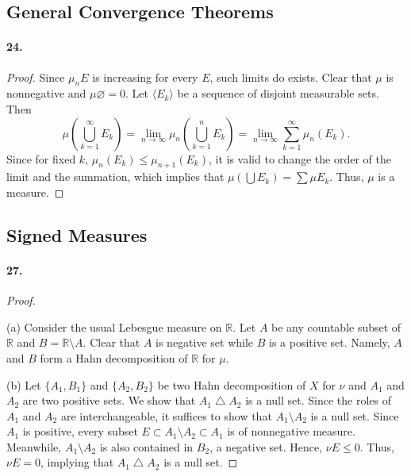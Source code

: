 \subsection{General Convergence Theorems}
  \paragraph{24.}
  \begin{proof}
    Since $\mu_n E$ is increasing for every $E$, such limits do exists. Clear 
    that $\mu$ is nonnegative and $\mu\varnothing=0$. Let $\langle E_k\rangle$ 
    be a sequence of disjoint measurable sets. Then
    \[
      \mu\left(\bigcup_{k=1}^\infty E_k\right)=
      \lim_{n\to\infty}\mu_n\left(\bigcup_{k=1}^n E_k\right)=
      \lim_{n\to\infty}\sum_{k=1}^\infty\mu_n(E_k).
    \]
    Since for fixed $k$, $\mu_n(E_k)\le\mu_{n+1}(E_k)$, it is valid to change 
    the order of the limit and the summation, which implies that $\mu(\bigcup
    E_k)=\sum\mu E_k$. Thus, $\mu$ is a measure.
  \end{proof}
\subsection{Signed Measures}
  \paragraph{27.}
  \begin{proof}
    $\,$\par
    (a) Consider the usual Lebesgue measure on $\mathbb{R}$. Let $A$ be any
    countable subset of $\mathbb{R}$ and $B=\mathbb{R}\setminus A$. Clear that
    $A$ is negative set while $B$ is a positive set. Namely, $A$ and $B$ form a 
    Hahn decomposition of $\mathbb{R}$ for $\mu$.\par
    (b) Let $\{A_1,B_1\}$ and $\{A_2,B_2\}$ be two Hahn decomposition of $X$ 
    for $\nu$ and $A_1$ and $A_2$ are two positive sets. We show that $A_1
    \bigtriangleup A_2$ is a null set. Since the roles of $A_1$ and $A_2$ are 
    interchangeable, it suffices to show that $A_1\setminus A_2$ is a null set.
    Since $A_1$ is positive, every subset $E\subset A_1\setminus A_2\subset 
    A_1$ is of nonnegative measure. Meanwhile, $A_1\setminus A_2$ is also 
    contained in $B_2$, a negative set. Hence, $\nu E\le 0$. Thus, $\nu E=0$,
    implying that $A_1\bigtriangleup A_2$ is a null set.
  \end{proof}
  
